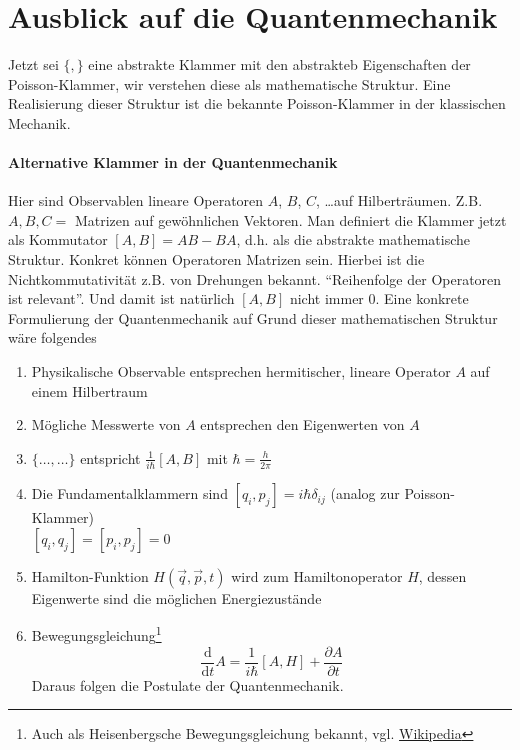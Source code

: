 \documentclass[oneside]{book}
\theoremstyle{definition}
\renewcommand{\d}{\mathrm d}
\newcommand{\dd}[1]{\frac{\d}{\d #1}}
\newcommand{\ffpartial}[2]{\frac{\partial #1}{\partial #2}}
\begin{document}
\newcommand{\fihbar}{\frac{1}{i \hbar}}

\section{Ausblick auf die Quantenmechanik}
Jetzt sei $\{,\}$ eine abstrakte Klammer mit den abstrakteb Eigenschaften der Poisson-Klammer, wir verstehen diese als mathematische Struktur.
Eine Realisierung dieser Struktur ist die bekannte Poisson-Klammer in der klassischen Mechanik.

\paragraph{Alternative Klammer in der Quantenmechanik}
Hier sind Observablen lineare Operatoren $A$, $B$, $C$, \dots auf Hilberträumen. Z.B. $A,B,C = $ Matrizen auf gewöhnlichen Vektoren. Man definiert die Klammer jetzt als Kommutator $[A,B] = AB - BA$, d.h.
als die abstrakte mathematische Struktur. Konkret können Operatoren Matrizen sein. Hierbei ist die Nichtkommutativität z.B. von Drehungen bekannt. "`Reihenfolge der Operatoren ist relevant"'. Und damit ist natürlich $[A, B]$ nicht immer $0$.
Eine konkrete Formulierung der Quantenmechanik auf Grund dieser mathematischen Struktur wäre folgendes
\begin{enumerate}
	\item Physikalische Observable entsprechen hermitischer, lineare Operator $A$ auf einem Hilbertraum
	\item Mögliche Messwerte von $A$ entsprechen den Eigenwerten von $A$
	\item $\{\dots, \dots\}$ entspricht $\fihbar [A, B]$ mit $\hbar = \frac{h}{2 \pi}$
	\item Die Fundamentalklammern sind
	$[q_i, p_j] = i \hbar \delta_{ij}$ (analog zur Poisson-Klammer)\\
	$[q_i, q_j] = [p_i, p_j] = 0$
	\item Hamilton-Funktion $H(\vec{q}, \vec{p}, t)$ wird zum Hamiltonoperator $H$, dessen Eigenwerte sind die möglichen Energiezustände
	\item Bewegungsgleichung\footnote{Auch als Heisenbergsche Bewegungsgleichung bekannt, vgl. \href{https://de.wikipedia.org/wiki/Heisenbergsche_Bewegungsgleichung}{Wikipedia}}
	$$\dd t A = \fihbar [A, H] + \ffpartial{A}{t}$$
	Daraus folgen die Postulate der Quantenmechanik.
\end{enumerate}
\end{document}
